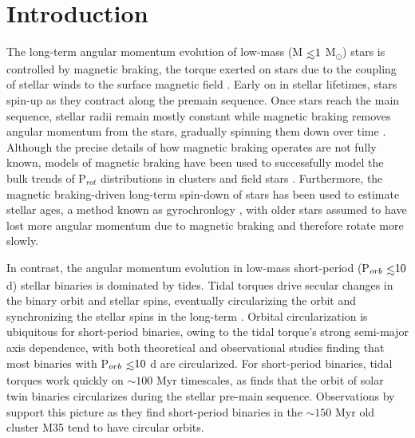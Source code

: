 \documentclass[twocolumn]{aastex61}
\def\lsim{~\rlap{$<$}{\lower 1.0ex\hbox{$\sim$}}}
\newcommand{\kepler}[0]{\textit{Kepler}\xspace}
\begin{document}
\begin{abstract}
\end{abstract}




\section{Introduction} \label{sec:intro}

The long-term angular momentum evolution of low-mass (M$\lsim 1$ M$_{\odot}$) stars is controlled by magnetic braking, the torque exerted on stars due to the coupling of stellar winds to the surface magnetic field \citep{Dunn1961,Mestel1968}. Early on in stellar lifetimes, stars spin-up as they contract along the premain sequence.  Once stars reach the main sequence, stellar radii remain mostly constant while magnetic braking removes angular momentum from the stars, gradually spinning them down over time \citep{Skumanich1972}. Although the precise details of how magnetic braking operates are not fully known, models of magnetic braking have been used to successfully model the bulk trends of P$_{rot}$ distributions in clusters \citep[e.g. Praesepe, ][]{Matt2015,Douglas2017} and field stars \citep[e.g. the \kepler field, ][]{Reiners2012,Matt2015,vanSaders2018}. Furthermore, the magnetic braking-driven long-term spin-down of stars has been used to estimate stellar ages, a method known as gyrochronlogy \citep{Skumanich1972,Barnes2003,Barnes2007,Mamajek2008,Barnes2010}, with older stars assumed to have lost more angular momentum due to magnetic braking and therefore rotate more slowly.

In contrast, the angular momentum evolution in low-mass short-period (P$_{orb} \lsim 10$ d) stellar binaries is dominated by tides.  Tidal torques drive secular changes in the binary orbit and stellar spins, eventually circularizing the orbit and synchronizing the stellar spins in the long-term \citep{Counselman1973}. Orbital circularization is ubiquitous for short-period binaries, owing to the tidal torque's strong semi-major axis dependence, with both theoretical \citep[e.g.][]{Zahn1989,Claret1995} and observational \citep[e.g.][]{Meibom2005,Mazeh2008,Lurie2017} studies finding that most binaries with P$_{orb} \lsim 10$ d are circularized. For short-period binaries, tidal torques work quickly on ${\sim}100$ Myr timescales, as \citet{Zahn1989} finds that the orbit of solar twin binaries circularizes during the stellar pre-main sequence.  Observations by \citet{Meibom2005} support this picture as they find short-period binaries in the ${\sim}150$ Myr old cluster M35 tend to have circular orbits.
\end{document}
